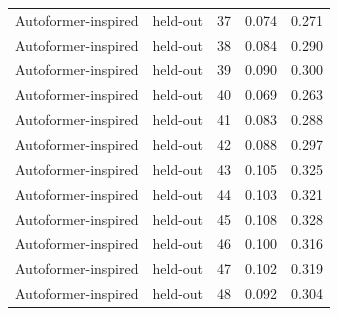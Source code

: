 \begin{tabular}{llrrr}
Autoformer-inspired & held-out & 37 & 0.074 & 0.271 \\
Autoformer-inspired & held-out & 38 & 0.084 & 0.290 \\
Autoformer-inspired & held-out & 39 & 0.090 & 0.300 \\
Autoformer-inspired & held-out & 40 & 0.069 & 0.263 \\
Autoformer-inspired & held-out & 41 & 0.083 & 0.288 \\
Autoformer-inspired & held-out & 42 & 0.088 & 0.297 \\
Autoformer-inspired & held-out & 43 & 0.105 & 0.325 \\
Autoformer-inspired & held-out & 44 & 0.103 & 0.321 \\
Autoformer-inspired & held-out & 45 & 0.108 & 0.328 \\
Autoformer-inspired & held-out & 46 & 0.100 & 0.316 \\
Autoformer-inspired & held-out & 47 & 0.102 & 0.319 \\
Autoformer-inspired & held-out & 48 & 0.092 & 0.304 \\
\bottomrule
\end{tabular}
